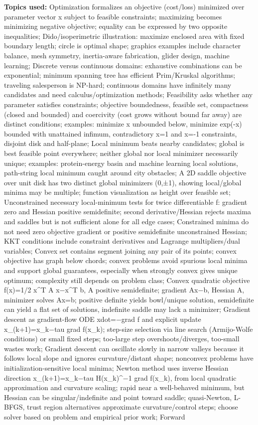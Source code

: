 \textbf{Topics used:} Optimization formalizes an objective (cost/loss) minimized over parameter vector x subject to feasible constraints; maximizing becomes minimizing negative objective; equality can be expressed by two opposite inequalities; Dido/isoperimetric illustration: maximize enclosed area with fixed boundary length; circle is optimal shape; graphics examples include character balance, mesh symmetry, inertia-aware fabrication, glider design, machine learning; Discrete versus continuous domains: exhaustive combinations can be exponential; minimum spanning tree has efficient Prim/Kruskal algorithms; traveling salesperson is NP-hard; continuous domains have infinitely many candidates and need calculus/optimization methods; Feasibility asks whether any parameter satisfies constraints; objective boundedness, feasible set, compactness (closed and bounded) and coercivity (cost grows without bound far away) are distinct conditions; examples: minimize x unbounded below, minimize exp(-x) bounded with unattained infimum, contradictory x=1 and x=-1 constraints, disjoint disk and half-plane; Local minimum beats nearby candidates; global is best feasible point everywhere; neither global nor local minimizer necessarily unique; examples: protein-energy basin and machine learning local solutions, path-string local minimum caught around city obstacles; A 2D saddle objective over unit disk has two distinct global minimizers (0,±1), showing local/global minima may be multiple; function visualization as height over feasible set; Unconstrained necessary local-minimum tests for twice differentiable f: gradient zero and Hessian positive semidefinite; second derivative/Hessian rejects maxima and saddles but is not sufficient alone for all edge cases; Constrained minima do not need zero objective gradient or positive semidefinite unconstrained Hessian; KKT conditions include constraint derivatives and Lagrange multipliers/dual variables; Convex set contains segment joining any pair of its points; convex objective has graph below chords; convex problems avoid spurious local minima and support global guarantees, especially when strongly convex gives unique optimum; complexity still depends on problem class; Convex quadratic objective f(x)=1/2 x\^{}T A x−x\^{}T b, A positive semidefinite; gradient Ax−b, Hessian A, minimizer solves Ax=b; positive definite yields bowl/unique solution, semidefinite can yield a flat set of solutions, indefinite saddle may lack a minimizer; Gradient descent as gradient-flow ODE xdot=−grad f and explicit update x\_(k+1)=x\_k−tau grad f(x\_k); step-size selection via line search (Armijo-Wolfe conditions) or small fixed steps; too-large step overshoots/diverges, too-small wastes work; Gradient descent can oscillate slowly in narrow valleys because it follows local slope and ignores curvature/distant shape; nonconvex problems have initialization-sensitive local minima; Newton method uses inverse Hessian direction x\_(k+1)=x\_k−tau H(x\_k)\^{}−1 grad f(x\_k), from local quadratic approximation and curvature scaling; rapid near a well-behaved minimum, but Hessian can be singular/indefinite and point toward saddle; quasi-Newton, L-BFGS, trust region alternatives approximate curvature/control steps; choose solver based on problem and empirical prior work; Forward 